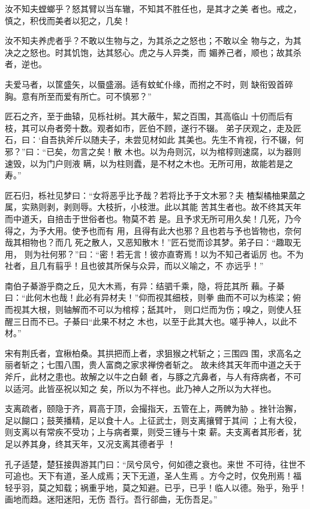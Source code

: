 \documentclass[12pt,UTF8]{ctexbook}
\begin{document}
汝不知夫螳螂乎？怒其臂以当车辙，不知其不胜任也，是其才之美 者也。戒之，慎之，积伐而美者以犯之，几矣！

汝不知夫养虎者乎？不敢以生物与之，为其杀之之怒也；不敢以全 物与之，为其决之之怒也。时其饥饱，达其怒心。虎之与人异类，而 媚养己者，顺也；故其杀者，逆也。

夫爱马者，以筐盛矢，以蜃盛溺。适有蚊虻仆缘，而拊之不时，则 缺衔毁首碎胸。意有所至而爱有所亡。可不慎邪？”

匠石之齐，至于曲辕，见栎社树。其大蔽牛，絜之百围，其高临山 十仞而后有枝，其可以舟者旁十数。观者如市，匠伯不顾，遂行不辍。 弟子厌观之，走及匠石，曰：‘自吾执斧斤以随夫子，未尝见材如此 其美也。先生不肯视，行不辍，何邪？”曰：“已矣，勿言之矣！散 木也。以为舟则沉，以为棺椁则速腐，以为器则速毁，以为门户则液 瞒，以为柱则蠹，是不材之木也。无所可用，故能若是之寿。”

匠石归，栎社见梦曰：“女将恶乎比予哉？若将比予于文木邪？夫 楂梨橘柚果蓏之属，实熟则剥，剥则辱。大枝折，小枝泄。此以其能 苦其生者也。故不终其天年而中道夭，自掊击于世俗者也。物莫不若 是。且予求无所可用久矣！几死，乃今得之，为予大用。使予也而有 用，且得有此大也邪？且也若与予也皆物也，奈何哉其相物也？而几 死之散人，又恶知散木！”匠石觉而诊其梦。弟子曰：“趣取无用， 则为社何邪？”曰：“密！若无言！彼亦直寄焉！以为不知己者诟厉 也。不为社者，且几有翦乎！且也彼其所保与众异，而以义喻之，不 亦远乎！”

南伯子綦游乎商之丘，见大木焉，有异：结驷千乘，隐，将芘其所 藾。子綦曰：“此何木也哉！此必有异材夫！”仰而视其细枝，则拳 曲而不可以为栋梁；俯而视其大根，则轴解而不可以为棺椁；舐其叶， 则口烂而为伤；嗅之，则使人狂醒三日而不已。子綦曰“此果不材之 木也，以至于此其大也。嗟乎神人，以此不材。”

宋有荆氏者，宜楸柏桑。其拱把而上者，求狙猴之杙斩之；三围四 围，求高名之丽者斩之；七围八围，贵人富商之家求禅傍者斩之。 故未终其天年而中道之夭于斧斤，此材之患也。故解之以牛之白颡 者，与豚之亢鼻者，与人有痔病者，不可以适河。此皆巫祝以知之 矣，所以为不祥也。此乃神人之所以为大祥也。

支离疏者，颐隐于齐，肩高于顶，会撮指天，五管在上，两髀为胁 。挫针治獬，足以餬口；鼓荚播精，足以食十人。上征武士，则支离攘臂于其间 ；上有大役，则支离以有常疾不受功；上与病者粟，则受三锺与十束 薪。夫支离者其形者，犹足以养其身，终其天年，又况支离其德者乎 ！

孔子适楚，楚狂接舆游其门曰：“凤兮凤兮，何如德之衰也。来世 不可待，往世不可追也。天下有道，圣人成焉；天下无道，圣人生焉 。方今之时，仅免刑焉！福轻乎羽，莫之知载；祸重乎地，莫之知避。已乎，已乎！临人以德。殆乎，殆乎！画地而趋。迷阳迷阳，无伤 吾行。吾行郤曲，无伤吾足。”
\end{document}
